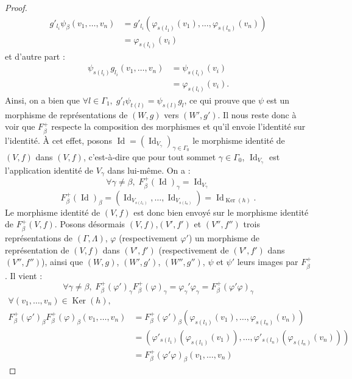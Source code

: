 \documentclass[a4paper,11pt]{article}
\DeclareMathOperator{\Ker}{Ker}
\DeclareMathOperator{\Id}{Id}
\begin{document}
\begin{proof}
\[
\begin{array}{ll}
	g'_{l_{i}}\psi_{\beta}(v_{1},\dots,v_{n})&=g'_{l_{i}}(\varphi_{s(l_{1})}(v_{1}),\dots,\varphi_{s(l_{n})}(v_{n}))\\
	&=\varphi_{s(l_{i})}(v_{i})
\end{array}
\]
et d'autre part :
\[
\begin{array}{ll}
	\psi_{s(l_{i})}g_{l_{i}}(v_{1},\dots,v_{n})&=\psi_{s(l_{i})}(v_{i})\\
	&=\varphi_{s(l_{i})}(v_{i}).
\end{array}
\]
Ainsi, on a bien que $\forall l \in\Gamma_{1},\;g'_{l}\psi_{t(l)}=\psi_{s(l)}g_{l}$, ce qui prouve que $\psi$ est un morphisme de représentations de $(W,g)$ vers $(W',g')$. Il nous reste donc à voir que $F_{\beta}^{+}$ respecte la composition des morphismes et qu'il envoie l'identité sur l'identité. À cet effet, posons $\Id = (\Id_{V_{\gamma}})_{\gamma\in\Gamma_{0}}$ le morphisme identité de $(V,f)$ dans $(V,f)$, c'est-à-dire que pour tout sommet $\gamma\in\Gamma_{0}$, $\Id_{V_{\gamma}}$ est l'application identité de $V_{\gamma}$ dans lui-même. On a :
\[
	\forall \gamma\neq\beta,\;F_{\beta}^{+}(\Id)_{\gamma}=\Id_{V_{\gamma}}
\]
\[
	F_{\beta}^{+}(\Id)_{\beta}=(\Id_{V_{s(l_{1})}},\dots,\Id_{V_{s(l_{n})}})=\Id_{\Ker(h)}.
\]
Le morphisme identité de $(V,f)$ est donc bien envoyé sur le morphisme identité de $F_{\beta}^{+}(V,f)$. Posons désormais $(V,f)$,$(V',f')$ et $(V'',f'')$ trois représentations de $(\Gamma,\Lambda)$, $\varphi$ (respectivement $\varphi '$) un morphisme de représentation de $(V,f)$ dans $(V',f')$ (respectivement de $(V',f')$ dans $(V'',f'')$), ainsi que $(W,g)$, $(W',g')$, $(W'',g'')$, 
 $\psi$ et $\psi '$ leurs images par $F_{\beta}^{+}$. Il vient :
\[
	\forall \gamma\neq\beta,\;F_{\beta}^{+}(\varphi')_{\gamma}F_{\beta}^{+}(\varphi)_{\gamma}=\varphi_{\gamma}'\varphi_{\gamma}=F_{\beta}^{+}(\varphi'\varphi)_{\gamma}
\]
\[
	\begin{array}{ll}
		\forall (v_{1},\dots,v_{n})\in\Ker(h),& \\
		F_{\beta}^{+}(\varphi')_{\beta}F_{\beta}^{+}(\varphi)_{\beta}(v_{1},\dots,v_{n})&=F_{\beta}^{+}(\varphi')_{\beta}(\varphi_{s(l_{1})}(v_{1}),\dots,\varphi_{s(l_{n})}(v_{n}))\\
		&=(\varphi'_{s(l_{1})}(\varphi_{s(l_{1})}(v_{1})),\dots,\varphi'_{s(l_{n})}(\varphi_{s(l_{n})}(v_{n})))\\
		&=F_{\beta}^{+}(\varphi'\varphi)_{\beta}(v_{1},\dots,v_{n})


\end{array}\]
\end{proof}
\end{document}
